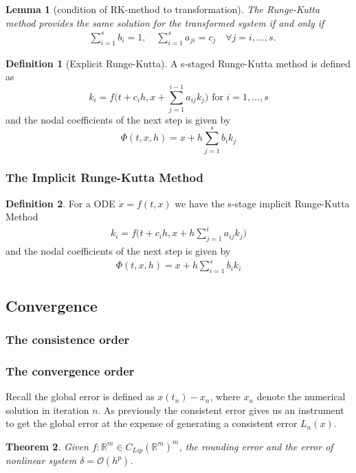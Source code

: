 \documentclass[a4paper,12pt,oneside,fleqn]{book}
\newtheorem{theorem}{Theorem}[section]
\newtheorem{lemma}[theorem]{Lemma}
\theoremstyle{definition}
\newtheorem{definition}{Definition}[section]
\theoremstyle{remark}
\begin{document}
\begin{lemma}[condition of RK-method to transformation]
	The Runge-Kutta method provides the same solution for the transformed system if and only if 
	\begin{align*}
		& \sum_{i = 1}^s b_i = 1, \quad \sum_{i = 1}^s a_{ji} = c_j \quad \forall j = i, \dots, s.
	\end{align*}
\end{lemma}


\begin{definition}[Explicit Runge-Kutta]
	A s-staged Runge-Kutta method is defined as 
	\begin{equation}\label{ODE_exRK}
		k_i = f\bigg(t + c_ih, x +  \sum_{j = 1}^{i - 1} a_{ij} k_j \bigg) \text{ for } i = 1, \dots, s
	\end{equation}
	and the nodal coefficients of the next step is given by
	\begin{equation}
		\Phi(t, x, h) = x + h \sum_{j = 1}^s b_i k_j
	\end{equation}
\end{definition}


\subsubsection{The Implicit Runge-Kutta Method}
\begin{definition}
	For a ODE $\dot{x} = f(t, x)$ we have the s-stage implicit Runge-Kutta Method
	\begin{align*}
		k_i = f \bigg( t + c_i h, x + h \sum_{j = 1}^i a_{ij} k_j\bigg)
	\end{align*}
	and the nodal coefficients of the next step is given by
	\begin{align*}
		\Phi(t, x, h) = x + h \sum_{i = 1}^s b_i k_i
	\end{align*}
\end{definition}



\subsection{Convergence}

\subsubsection{The consistence order}

\subsubsection{The convergence order}
Recall the global error is defined as $x(t_n) - x_n$, where $x_n$ denote the numerical solution in iteration $n$. As previously the consistent error gives us an instrument to get the global error at the expense of generating a consistent error $L_n(x)$. 
\begin{theorem}
	Given $f: \mathbb{R}^m \in C_{Lip}(\mathbb{R}^m)^m$, the rounding error and the error of nonlinear system $\delta = \mathcal{O}(h^p)$. 
\end{theorem}
\end{document}
